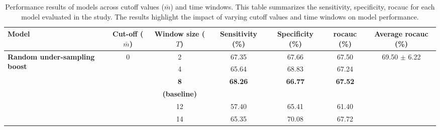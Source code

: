 \begin{sidewaystable}
\centering
\caption{Performance results of models across cutoff values ($\bar{m}$) and time windows. This table summarizes the sensitivity, specificity, \Gls{rocauc} for each model evaluated in the study. The results highlight the impact of varying cutoff values and time windows on model performance.}
\label{tab:my-table3}
\begin{adjustbox}{totalheight=0.85\textheight, width=\textwidth, keepaspectratio}
\begin{tabularx}{1.4\textwidth}{Xcccccc}
\toprule
\textbf{Model}                                         & \textbf{Cut-off ($\bar{m}$)} & \textbf{Window size ($T$)} & \textbf{Sensitivity (\%)}       & \textbf{Specificity (\%)}       & \textbf{\Gls{rocauc} (\%)}           & \textbf{Average \Gls{rocauc} (\%)}   \\
\midrule
\multirow{18}{=}{\textbf{Random under-sampling boost}} & \multirow{6}{*}{0}    & 2                        & 67.35                           & 67.66                           & 67.50                            & \multirow{18}{*}{69.50 $\pm$ 6.22}  \\ 
                                                       &                       & 4                        & 65.64                           & 68.83                           & 67.24                           &                                 \\ 
                                                       &                       & \textbf{8}               & \multirow{2}{*}{\textbf{68.26}} & \multirow{2}{*}{\textbf{66.77}} & \multirow{2}{*}{\textbf{67.52}} &                                 \\
                                                       &                       & \textbf{(baseline)}      &                                 &                                 &                                 &                                 \\ 
                                                       &                       & 12                       & 57.40                            & 65.41                           & 61.40                            &                                 \\ 
                                                       &                       & 14                       & 65.35                           & 70.08                           & 67.72                           &                                 \\ 

\end{tabularx}
\end{adjustbox}
\end{sidewaystable}
